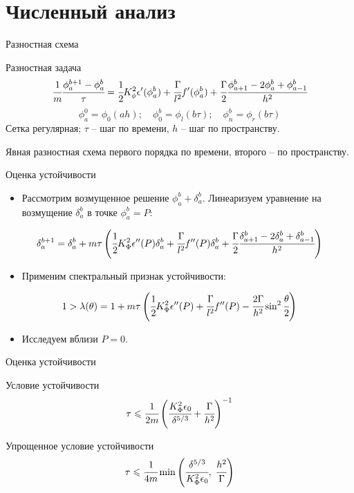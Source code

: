 \section{Численный анализ}

\begin{frame}{Разностная схема}
\begin{block}{Разностная задача}
	$$\cfrac{1}{m} \cfrac{\phi_a^{b + 1} - \phi_a^b}{\tau} = \cfrac{1}{2} K_\phi^2
	\epsilon'(\phi_a^b) + \cfrac{\Gamma}{l^2} f'(\phi_a^b) + \cfrac{\Gamma}{2}
	\cfrac{\phi_{a + 1}^b - 2 \phi_a^b + \phi_{a - 1}^b}{h^2}$$
	$$\phi_a^0 = \phi_0(ah); \quad \phi_0^b = \phi_l(b \tau); \quad \phi_n^b = \phi_r(b \tau)$$
	Сетка регулярная; $\tau$ -- шаг по времени, $h$ -- шаг по пространству.
\end{block}
Явная разностная схема первого порядка по времени, второго -- по пространству.
\end{frame}


\begin{frame}{Оценка устойчивости}
\begin{itemize}
\item Рассмотрим возмущенное решение $\phi_a^b + \delta_a^b$. Линеаризуем уравнение на возмущение
$\delta_a^b$ в точке $\phi_a^b = P$:
\end{itemize}
$$\delta_a^{b + 1} = \delta_a^b + m \tau \left( \cfrac{1}{2} K_\Phi^2 \epsilon''(P) \delta_a^b +
\cfrac{\Gamma}{l^2} f''(P) \delta_a^b + \cfrac{\Gamma}{2} \cfrac{\delta_{a + 1}^b - 2 \delta_a^b +
\delta_{a - 1}^b}{h^2} \right)$$
\begin{itemize}
\item Применим спектральный признак устойчивости:
\end{itemize}
$$1 > \lambda(\theta) = 1 + m \tau \left( \cfrac{1}{2} K_\Phi^2 \epsilon''(P) +
\cfrac{\Gamma}{l^2} f''(P) - \cfrac{2 \Gamma}{h^2} \sin^2 \cfrac{\theta}{2} \right)$$
\begin{itemize}
\item Исследуем вблизи $P = 0$.
\end{itemize}
\end{frame}


\begin{frame}{Оценка устойчивости}
\begin{block}{Условие устойчивости}
	$$\tau \leqslant \cfrac{1}{2m} \left( \cfrac{K_\Phi^2 \epsilon_0}{\delta^{5/3}} +
	\cfrac{\Gamma}{h^2} \right)^{-1}$$
\end{block}
\begin{block}{Упрощенное условие устойчивости}
	$$\tau \leqslant \cfrac{1}{4m} \min \left(\cfrac{\delta^{5/3}}{K_\Phi^2 \epsilon_0}, \;
	\cfrac{h^2}{\Gamma} \right)$$
\end{block}
\end{frame}


